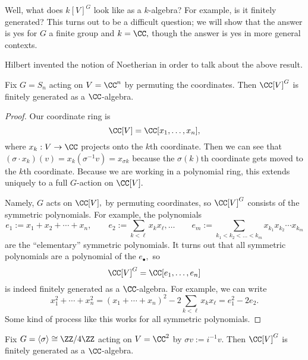 \documentclass[../notes.tex]{subfiles}
\begin{document}
Well, what does $k[V]^G$ look like as a $k$-algebra? For example, is it finitely generated? This turns out to be a difficult question; we will show that the answer is yes for $G$ a finite group and $k=\CC,$ though the answer is yes in more general contexts.
\begin{remark}
	Hilbert invented the notion of Noetherian in order to talk about the above result.
\end{remark}
\begin{exercise}
	Fix $G=S_n$ acting on $V=\CC^n$ by permuting the coordinates. Then $\CC[V]^G$ is finitely generated as a $\CC$-algebra.
\end{exercise}
\begin{proof}
	Our coordinate ring is
	\[\CC[V]=\CC[x_1,\ldots,x_n],\]
	where $x_k:V\to\CC$ projects onto the $k$th coordinate. Then we can see that $(\sigma\cdot x_k)(v)=x_k(\sigma^{-1}v)=x_{\sigma k}$ because the $\sigma(k)$th coordinate gets moved to the $k$th coordinate. Because we are working in a polynomial ring, this extends uniquely to a full $G$-action on $\CC[V].$
	
	Namely, $G$ acts on $\CC[V],$ by permuting coordinates, so $\CC[V]^G$ consists of the symmetric polynomials. For example, the polynomials
	\[e_1:=x_1+x_2+\cdots+x_n,\qquad e_2:=\sum_{k<\ell}x_kx_\ell,\ldots\qquad e_m:=\sum_{k_1<k_2<\ldots<k_m}x_{k_1}x_{k_2}\cdots x_{k_m}\]
	are the ``elementary'' symmetric polynomials. It turns out that all symmetric polynomials are a polynomial of the $e_\bullet,$ so
	\[\CC[V]^G=\CC[e_1,\ldots,e_n]\]
	is indeed finitely generated as a $\CC$-algebra. For example, we can write
	\[x_1^2+\cdots+x_n^2=(x_1+\cdots+x_n)^2-2\sum_{k<\ell}x_kx_\ell=e_1^2-2e_2.\]
	Some kind of process like this works for all symmetric polynomials.
\end{proof}
\begin{exercise}
	Fix $G=\langle\sigma\rangle\cong\ZZ/4\ZZ$ acting on $V=\CC^2$ by $\sigma v:=i^{-1}v.$ Then $\CC[V]^G$ is finitely generated as a $\CC$-algebra.
\end{exercise}
\end{document}
